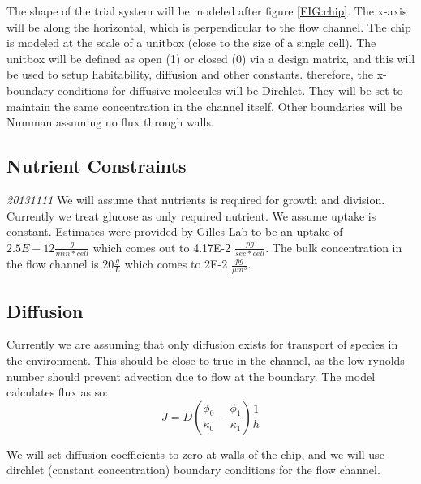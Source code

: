\documentclass{article}
\begin{document}
The shape of the trial system will be modeled after figure \ref{FIG:chip}.
The x-axis will be along the horizontal, 
which is perpendicular to the flow channel.
The chip is modeled at the scale of a unitbox (close to the size of a single cell).
The unitbox will be defined as open (1) or closed (0) via a design matrix,
and this will be used to setup habitability, diffusion and other constants.
therefore, the x-boundary conditions for diffusive molecules will be Dirchlet.
They will be set to maintain the same concentration in the channel itself.
Other boundaries will be Numman assuming no flux through walls.

\subsection{Nutrient Constraints}
\label{S:nutriant}
\emph{20131111} We will assume that nutrients is required for growth and division.
Currently we treat glucose as only required nutrient.
We assume uptake is constant.
Estimates were provided by Gilles Lab to be an uptake of
$2.5E-12 \frac{g}{min*cell}$ which comes out to 4.17E-2 $\frac{pg}{sec*cell}$.
The bulk concentration in the flow channel is $20\frac{g}{L}$ which comes to 2E-2 $\frac{pg}{\mu m^3}$.

\subsection{Diffusion}
Currently we are assuming that only diffusion exists for transport of species in the environment.
This should be close to true in the channel, as the low rynolds number should prevent advection due to flow at the boundary.
The model calculates flux as so:
\begin{equation}
J = D ( \frac{\phi_0}{\kappa_0} - \frac{\phi_1}{\kappa_1} ) \frac{1}{h}
\label{EQ:diff}
\end{equation}

We will set diffusion coefficients to zero at walls of the chip,
and we will use dirchlet (constant concentration) boundary conditions for the flow channel.
\end{document}
